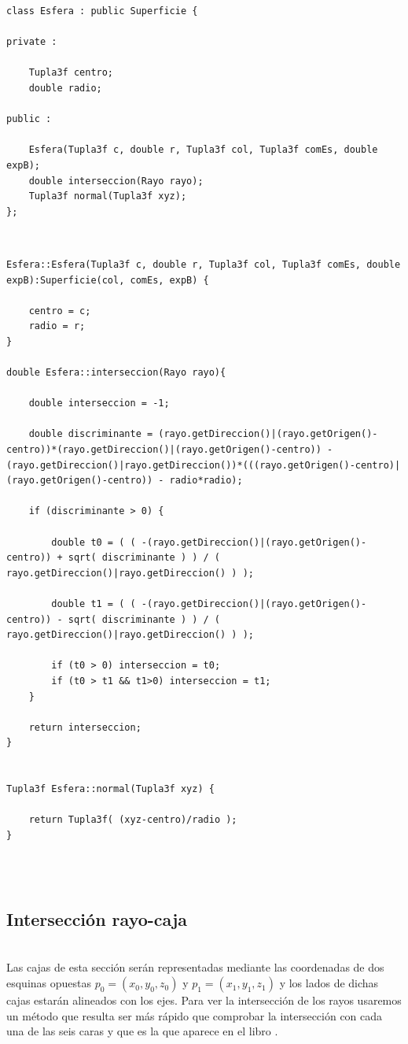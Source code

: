 \begin{lstlisting}[style=Consola]
class Esfera : public Superficie {

private :

	Tupla3f centro;
	double radio;

public :

	Esfera(Tupla3f c, double r, Tupla3f col, Tupla3f comEs, double expB);
	double interseccion(Rayo rayo);
	Tupla3f normal(Tupla3f xyz);
};
\end{lstlisting}
${ }$\\

\begin{lstlisting}[style=Consola]
Esfera::Esfera(Tupla3f c, double r, Tupla3f col, Tupla3f comEs, double expB):Superficie(col, comEs, expB) {

	centro = c;
	radio = r;
}

double Esfera::interseccion(Rayo rayo){

	double interseccion = -1;

	double discriminante = (rayo.getDireccion()|(rayo.getOrigen()-centro))*(rayo.getDireccion()|(rayo.getOrigen()-centro)) - (rayo.getDireccion()|rayo.getDireccion())*(((rayo.getOrigen()-centro)|(rayo.getOrigen()-centro)) - radio*radio);

	if (discriminante > 0) {
	
		double t0 = ( ( -(rayo.getDireccion()|(rayo.getOrigen()-centro)) + sqrt( discriminante ) ) / ( rayo.getDireccion()|rayo.getDireccion() ) );
		
		double t1 = ( ( -(rayo.getDireccion()|(rayo.getOrigen()-centro)) - sqrt( discriminante ) ) / ( rayo.getDireccion()|rayo.getDireccion() ) );

		if (t0 > 0) interseccion = t0;
		if (t0 > t1 && t1>0) interseccion = t1;
	}
	
	return interseccion;
}


Tupla3f Esfera::normal(Tupla3f xyz) {

	return Tupla3f( (xyz-centro)/radio );
}
\end{lstlisting}
${ }$\\

${ }$\\
\subsection{Intersección rayo-caja}
${ }$\\

Las cajas de esta sección serán representadas mediante las coordenadas de dos esquinas opuestas $p_0 = (x_0, y_0, z_0)$ y $p_1 = (x_1, y_1, z_1)$ y los lados de dichas cajas estarán alineados con los ejes. Para ver la intersección de los rayos usaremos un método que resulta ser más rápido que comprobar la intersección con cada una de las seis caras y que es la que aparece en el libro \cite{Shirley}.
	${ }$\\	
	
